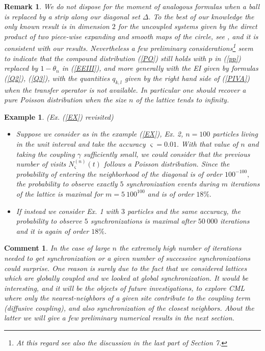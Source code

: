 \documentclass[12pt,reqno,a4paper]{amsart}
\newtheorem{example}[thm]{Example}
\newtheorem{rmk}[thm]{Remark}
\newtheorem{com}[thm]{Comment}
\begin{document}
\begin{rmk}
We do not dispose for the moment of analogous formulas when a ball is replaced by a strip along our diagonal set $\Delta.$ To the best of our knowledge the only known  result  is in dimension $2$ for the {\em uncoupled} systems given by the direct product of two piece-wise expanding and smooth
maps of the circle, see \cite{CC}, and it is consistent with our results. Nevertheless a few preliminary considerations\footnote{At this regard see also the discussion in the last part of Section 7.} seem to indicate  that the compound distribution (\ref{PO}) still holds with $p$ in (\ref{pp}) replaced by $1-\theta_n$ in (\ref{EEIII}),  and more generally with the EI given by formulas (\ref{Q2}), (\ref{Q3}), with the quantities $q_{k,l}$ given by the right hand side of (\ref{PIVA}) when the transfer operator is not available. In particular one should recover a pure Poisson distribution when the size $n$ of the lattice tends to infinity.
\end{rmk}
\begin{example}(Ex. (\ref{EX}) revisited)
\begin{itemize}
\item Suppose we consider as in the example (\ref{EX}), Ex. 2,  $n=100$ particles living in the unit interval and take the accuracy $\varsigma=0.01.$ With that value of $n$ and taking the coupling $\gamma$ sufficiently small, we could consider that the previous number of visits $N_{\varsigma}^{(n)}(t)$ follows a Poisson distribution. Since the probability of entering the neighborhood of the diagonal is of order $100^{-100},$
the
probability to observe exactly $5$ synchronization events during $m$ iterations of the lattice is maximal for $m=5\ 100^{100}$ and is of  order  $18\%.$
\item If instead we consider Ex. 1 with $3$ particles and the same accuracy, the probability to observe $5$ synchronizations is maximal after  $50\ 000$ iterations and it is again of order  $18\%.$
    \end{itemize}
\end{example}
\begin{com}
In the case of large $n$ the extremely high number of iterations needed to get synchronization or a given number of successive  synchronizations   could surprise. One reason is surely due to the fact that we considered lattices which are globally coupled and we looked at global synchronization. It would be interesting, and it will be the objects of future investigations,  to explore CML where only the nearest-neighbors of a given site contribute to the coupling term ({\em diffusive coupling}), and also synchronization of the closest neighbors. About the latter we will give a few preliminary numerical results in the next section.
\end{com}
\end{document}
